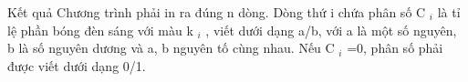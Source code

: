 Kết quả
Chương trình phải in ra đúng n dòng. Dòng thứ i chứa phân số C   $_    i   $   là tỉ lệ phần bóng đèn sáng với màu k   $_    i   $   , viết dưới dạng a/b, với a là một số nguyên, b là số nguyên dương và a, b nguyên tố cùng nhau. Nếu C   $_    i   $   =0, phân số phải được viết dưới dạng 0/1.
